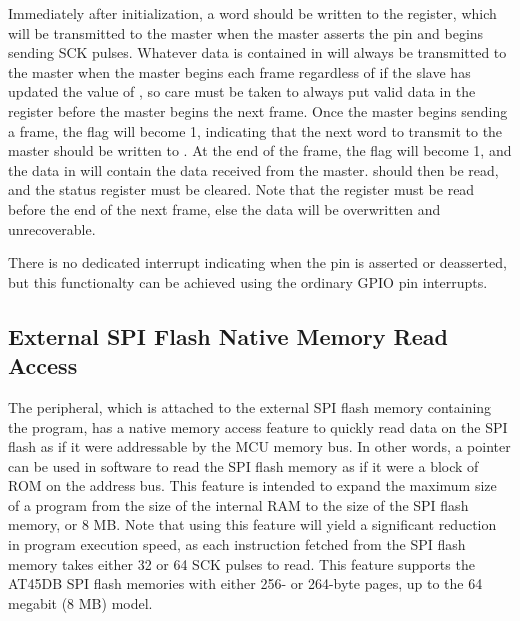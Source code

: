 Immediately after initialization, a word should be written to the  register, which will be transmitted to the master when the master asserts the  pin and begins sending SCK pulses. Whatever data is contained in  will always be transmitted to the master when the master begins each frame regardless of if the slave has updated the value of , so care must be taken to always put valid data in the  register before the master begins the next frame. Once the master begins sending a frame, the  flag will become 1, indicating that the next word to transmit to the master should be written to . At the end of the frame, the  flag will become 1, and the data in  will contain the data received from the master.  should then be read, and the status register  must be cleared. Note that the  register must be read before the end of the next frame, else the data will be overwritten and unrecoverable.

There is no dedicated interrupt indicating when the  pin is asserted or deasserted, but this functionalty can be achieved using the ordinary GPIO pin interrupts.



\subsection{External SPI Flash Native Memory Read Access}

The  peripheral, which is attached to the external SPI flash memory containing the program, has a native memory access feature to quickly read data on the SPI flash as if it were addressable by the MCU memory bus. In other words, a pointer can be used in software to read the SPI flash memory as if it were a block of ROM on the address bus. This feature is intended to expand the maximum size of a program from the size of the internal RAM to the size of the SPI flash memory, or 8 MB. Note that using this feature will yield a significant reduction in program execution speed, as each instruction fetched from the SPI flash memory takes either 32 or 64 SCK pulses to read. This feature supports the AT45DB SPI flash memories with either 256- or 264-byte pages, up to the 64 megabit (8 MB) model.


